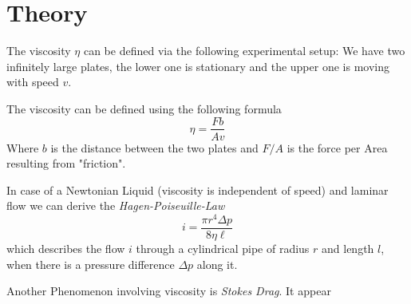 \section{Theory}

The viscosity $\eta$ can be defined via the following experimental setup: We have two infinitely large plates, the lower one is stationary and the upper one is moving with speed $v$.

The viscosity can be defined using the following formula
\[
    \eta = \frac{F b}{A v} \label{eq:vis}
\]
Where $b$ is the distance between the two plates and $F/A$ is the force per Area resulting from "friction".

In case of a Newtonian Liquid (viscosity is independent of speed) and laminar flow  we can derive the \emph{Hagen-Poiseuille-Law} 
\[
    i = \frac{\pi r^4 \Delta p}{8 \eta \ell} \label{eq:hp}
\]
which describes the flow $i$ through a cylindrical pipe of radius $r$ and length $l$, when there is a pressure difference $\Delta p$ along it.

Another Phenomenon involving viscosity is \emph{Stokes Drag}. It appear
